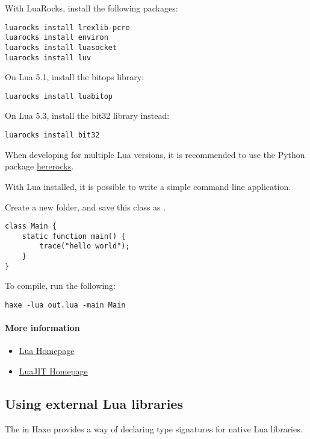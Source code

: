 With LuaRocks, install the following packages:

\begin{lstlisting}
luarocks install lrexlib-pcre
luarocks install environ
luarocks install luasocket
luarocks install luv
\end{lstlisting}

On Lua 5.1, install the bitops library:
\begin{lstlisting}
luarocks install luabitop
\end{lstlisting}

On Lua 5.3, install the bit32 library instead:
\begin{lstlisting}
luarocks install bit32
\end{lstlisting}

When developing for multiple Lua versions, it is recommended to use
the Python package \href{https://github.com/mpeterv/hererocks}{hererocks}.

With Lua installed, it is possible to write a simple command line application.

Create a new folder, and save this class as .

\begin{lstlisting}
class Main {
    static function main() {
        trace("hello world");
    }
}
\end{lstlisting}

To compile, run the following:
\begin{lstlisting}
haxe -lua out.lua -main Main
\end{lstlisting}

\paragraph{More information}
\begin{itemize}
	\item \href{https://www.lua.org/}{Lua Homepage}
	\item \href{http://luajit.org/}{LuaJIT Homepage}
\end{itemize}

\subsection{Using external Lua libraries}
\label{target-lua-external-libraries}

The  in Haxe provides a way of declaring type signatures
for native Lua libraries.

